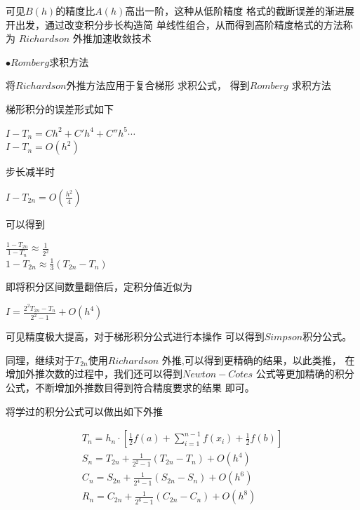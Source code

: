 \documentclass[11pt, a4paper, oneside]{ctexart}
\begin{document}
{{{{{    可见$B(h)$的精度比$A(h)$高出一阶，这种从低阶精度
    格式的截断误差的渐进展开出发，通过改变积分步长构造简
    单线性组合，从而得到高阶精度格式的方法称为 
    $Richardson$ 外推加速收敛技术
    }

    {
    $\bullet Romberg$求积方法
    \par  将$Richardson$外推方法应用于复合梯形
    求积公式，
    得到$Romberg$ 求积方法
    

    梯形积分的误差形式如下
    \begin{center}
        $I-T_{n}=Ch^2 + C'h^{4}+C''h^{5}\cdots$\\
        $I-T_{n}= O(h^2)$
    \end{center} 
    

    步长减半时
    \begin{center}
        $I-T_{2n}=O(\frac{h^2}{4})$
    \end{center} 
    
    
    可以得到
    \begin{center}
        $\frac{1-T_{2n}}{1-T_{n}}\approx \frac {1}{2^2}$
        \\
        $1-T_{2n} \approx \frac{1}{3}(T_{2n}-T_n)$
    \end{center} 


    即将积分区间数量翻倍后，定积分值近似为
    \begin{center}
        \Large$I=\frac{2^2T_{2n}-T_n}{2^2-1}+O(h^4)$
    \end{center} 


    可见精度极大提高，对于梯形积分公式进行本操作
    可以得到$Simpson$积分公式。

    同理，继续对于$T_{2n}$使用$Richardson$
    外推,可以得到更精确的结果，以此类推，
    在增加外推次数的过程中，我们还可以得到$Newton-Cotes$
    公式等更加精确的积分公式，不断增加外推数目得到符合精度要求的结果
    即可。
    
    
    将学过的积分公式可以做出如下外推

    \vspace{-14mm}
    \begin{center}
        $$
            \begin{array}{c}
            T_{n}=h_{n} \cdot\left[\frac{1}{2} f(a)+\sum_{i=1}^{n-1} f\left(x_{i}\right)+\frac{1}{2} f(b)\right] \\
            S_{n}=T_{2 n}+\frac{1}{2^{2}-1}\left(T_{2 n}-T_{n}\right)+O\left(h^{4}\right) \\
            C_{n}=S_{2 n}+\frac{1}{2^{4}-1}\left(S_{2 n}-S_{n}\right)+O\left(h^{6}\right) \\
            R_{n}=C_{2 n}+\frac{1}{2^{6}-1}\left(C_{2 n}-C_{n}\right)+O\left(h^{8}\right)
            \end{array}
        $$    
        \end{center}
    
}}}}}
\end{document}
